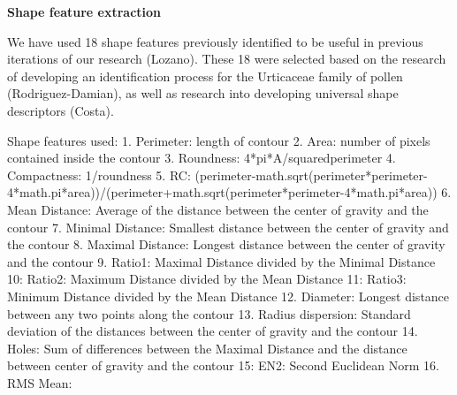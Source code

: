 \textbf{Shape feature extraction}

We have used 18 shape features previously identified to be useful in previous iterations of our research (Lozano). These 18 were selected based on the research of developing an identification process for the Urticaceae family of pollen (Rodriguez-Damian), as well as research into developing universal shape descriptors (Costa).

Shape features used:
1. Perimeter: length of contour
2. Area: number of pixels contained inside the contour
3. Roundness: 4*pi*A/squaredperimeter
4. Compactness: 1/roundness
5. RC: (perimeter-math.sqrt(perimeter*perimeter-4*math.pi*area))/(perimeter+math.sqrt(perimeter*perimeter-4*math.pi*area))
6. Mean Distance: Average of the distance between the center of gravity and the contour
7. Minimal Distance: Smallest distance between the center of gravity and the contour
8. Maximal Distance: Longest distance between the center of gravity and the contour
9. Ratio1: Maximal Distance divided by the Minimal Distance
10: Ratio2: Maximum Distance divided by the Mean Distance
11: Ratio3: Minimum Distance divided by the Mean Distance
12. Diameter: Longest distance between any two points along the contour
13. Radius dispersion: Standard deviation of the distances between the center of gravity and the contour
14. Holes: Sum of differences between the Maximal Distance and the distance between center of gravity and the contour
15: EN2: Second Euclidean Norm
16. RMS Mean: